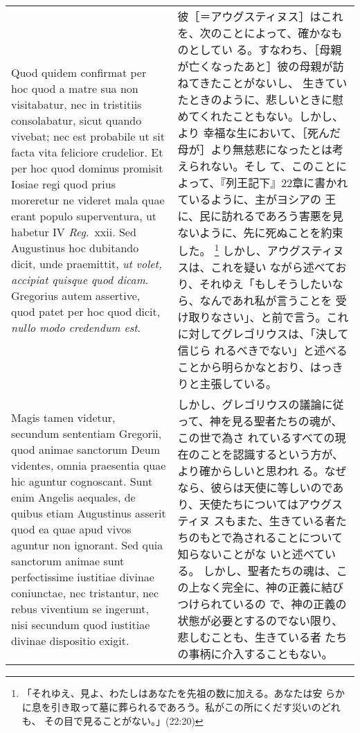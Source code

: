 \documentclass[10pt]{jsarticle} %
\begin{document}
\begin{longtable}{p{21em}p{21em}}
\\


Quod quidem confirmat per hoc quod a matre sua non visitabatur, nec in
 tristitiis consolabatur, sicut quando vivebat; nec est probabile ut sit
 facta vita feliciore crudelior. Et per hoc quod dominus promisit Iosiae
 regi quod prius moreretur ne videret mala quae erant populo
 superventura, ut habetur IV {\it Reg}.~{\sc xxii}. Sed Augustinus hoc
 dubitando dicit, unde praemittit, {\it ut volet, accipiat quisque quod
 dicam}. Gregorius autem assertive, quod patet per hoc quod dicit, {\it
 nullo modo credendum est}.


& 彼［＝アウグスティヌス］はこれを、次のことによって、確かなものとしてい
る。すなわち、［母親が亡くなったあと］彼の母親が訪ねてきたことがないし、
生きていたときのように、悲しいときに慰めてくれたこともない。しかし、より
幸福な生において、［死んだ母が］より無慈悲になったとは考えられない。そし
て、このことによって、『列王記下』22章に書かれているように、主がヨシアの
王に、民に訪れるであろう害悪を見ないように、先に死ぬことを約束した。
\footnote{「それゆえ、見よ、わたしはあなたを先祖の数に加える。あなたは安
らかに息を引き取って墓に葬られるであろう。私がこの所にくだす災いのどれも、
その目で見ることがない。」(22:20)} しかし、アウグスティヌスは、これを疑い
ながら述べており、それゆえ「もしそうしたいなら、なんであれ私が言うことを
受け取りなさい」、と前で言う。これに対してグレゴリウスは、「決して信じら
れるべきでない」と述べることから明らかなとおり、はっきりと主張している。
\\




Magis tamen videtur, secundum sententiam Gregorii,
 quod animae sanctorum Deum videntes, omnia praesentia quae hic aguntur
 cognoscant. Sunt enim Angelis aequales, de quibus etiam Augustinus
 asserit quod ea quae apud vivos aguntur non ignorant. Sed quia
 sanctorum animae sunt perfectissime iustitiae divinae coniunctae, nec
 tristantur, nec rebus viventium se ingerunt, nisi secundum quod
 iustitiae divinae dispositio exigit.


&

しかし、グレゴリウスの議論に従って、神を見る聖者たちの魂が、この世で為さ
 れているすべての現在のことを認識するという方が、より確からしいと思われ
 る。なぜなら、彼らは天使に等しいのであり、天使たちについてはアウグスティヌ
 スもまた、生きている者たちのもとで為されることについて知らないことがな
 いと述べている。
しかし、聖者たちの魂は、この上なく完全に、神の正義に結びつけられているの
 で、神の正義の状態が必要とするのでない限り、悲しむことも、生きている者
 たちの事柄に介入することもない。


\end{longtable}
\end{document}
